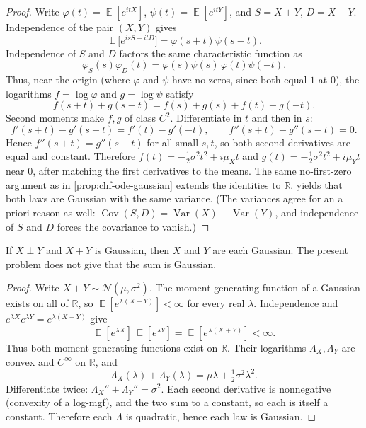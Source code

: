 \documentclass[11pt,a4paper]{article}
\DeclareMathOperator{\Var}{Var}
\DeclareMathOperator{\E}{\mathbb{E}}
\begin{document}
\begin{proof}
Write \( \varphi(t)=\E[e^{itX}] \), \( \psi(t)=\E[e^{itY}] \), and \( S=X+Y \), \( D=X-Y \). Independence of the pair \( (X,Y) \) gives
\[
\E\bigl[e^{isS+itD}\bigr]
=
\varphi(s+t)\psi(s-t).
\]
Independence of \( S \) and \( D \) factors the same characteristic function as
\[
\varphi_S(s)\varphi_D(t)
=
\varphi(s)\psi(s)\,\varphi(t)\psi(-t).
\]
Thus, near the origin (where \( \varphi \) and \( \psi \) have no zeros, since both equal \( 1 \) at \( 0 \)), the logarithms \( f=\log\varphi \) and \( g=\log\psi \) satisfy
\[
f(s+t)+g(s-t)
=
f(s)+g(s)+f(t)+g(-t).
\]
Second moments make \( f,g \) of class \( C^{2} \). Differentiate in \( t \) and then in \( s \):
\[
f'(s+t)-g'(s-t)
=
f'(t)-g'(-t),
\qquad
f''(s+t)-g''(s-t)
=
0.
\]
Hence \( f''(s+t)=g''(s-t) \) for all small \( s,t \), so both second derivatives are equal and constant. Therefore \( f(t)=-\frac12\sigma^{2}t^{2}+i\mu_X t \) and \( g(t)=-\frac12\sigma^{2}t^{2}+i\mu_Y t \) near \( 0 \), after matching the first derivatives to the means. The same no-first-zero argument as in \cref{prop:chf-ode-gaussian} extends the identities to \( \mathbb{R} \).  yields that both laws are Gaussian with the same variance. (The variances agree for an a priori reason as well: \( \operatorname{Cov}(S,D)=\Var(X)-\Var(Y) \), and independence of \( S \) and \( D \) forces the covariance to vanish.)
\end{proof}

\begin{proposition}[Cramér]
\label{prop:cramer}
If \( X\perp Y \) and \( X+Y \) is Gaussian, then \( X \) and \( Y \) are each Gaussian. The present problem does not give that the sum is Gaussian.
\end{proposition}

\begin{proof}
Write \( X+Y\sim\mathcal{N}(\mu,\sigma^{2}) \). The moment generating function of a Gaussian exists on all of \( \mathbb{R} \), so \( \E[e^{\lambda(X+Y)}]<\infty \) for every real \( \lambda \). Independence and \( e^{\lambda X}e^{\lambda Y}=e^{\lambda(X+Y)} \) give
\[
\E[e^{\lambda X}]\,\E[e^{\lambda Y}]
=
\E[e^{\lambda(X+Y)}]
<\infty.
\]
Thus both moment generating functions exist on \( \mathbb{R} \). Their logarithms \( \Lambda_X,\Lambda_Y \) are convex and \( C^{\infty} \) on \( \mathbb{R} \), and
\[
\Lambda_X(\lambda)+\Lambda_Y(\lambda)
=
\mu\lambda+\tfrac12\sigma^{2}\lambda^{2}.
\]
Differentiate twice: \( \Lambda_X''+\Lambda_Y''=\sigma^{2} \). Each second derivative is nonnegative (convexity of a log-mgf), and the two sum to a constant, so each is itself a constant. Therefore each \( \Lambda \) is quadratic, hence each law is Gaussian.
\end{proof}
\end{document}
